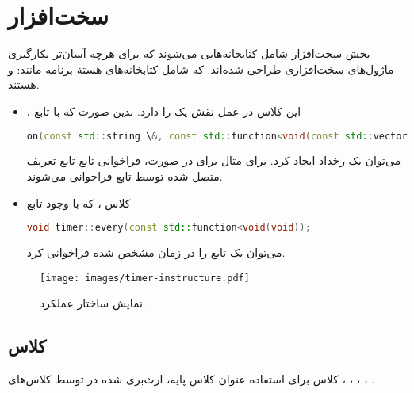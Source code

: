 \section{سخت‌افزار}
بخش سخت‌افزار شامل کتابخانه‌هایی می‌شوند که برای هرچه آسان‌تر بکارگیری ماژول‌های سخت‌افزاری طراحی شده‌اند.
که شامل کتابخانه‌های هستهٔ‌ برنامه مانند:  و  هستند.
\begin{itemize}[nosep]
	\item {}،
	این کلاس در عمل نقش یک  را دارد.
	بدین صورت که با تابع
	\begin{latin}
		\small
		\begin{lstlisting}[language=c++]
			on(const std::string \&, const std::function<void(const std::vector<std::any>\&));
		\end{lstlisting}
	\end{latin}
	می‌توان یک رخداد ایجاد کرد. \newline
	برای مثال برای
	در صورت، فراخوانی تابع
	تابع تعریف متصل شده توسط تابع
	فراخوانی می‌شوند.
	\item {}
	کلاس ،‌ که با وجود تابع
	\begin{latin}
		\small
		\begin{lstlisting}[language=c++]
			void timer::every(const std::function<void(void));
		\end{lstlisting}
	\end{latin}
	می‌توان یک تابع را در زمان مشخص شده فراخوانی کرد.
\end{itemize}

\begin{figure}[!h]
	\begin{center}
		\texttt{[image: images/timer-instructure.pdf]}
	\end{center}
	\caption{نمایش ساختار عملکرد .}
	\label{fig1:chap6}
\end{figure}

\subsection{کلاس }
کلاس  برای استفاده عنوان کلاس پایه، ارث‌بری شده در توسط کلاس‌های
،
،
،
،
.


